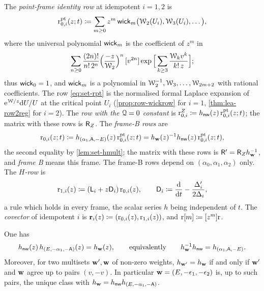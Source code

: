 \begin{defn}
\label{def:set-rows}
The \emph{point-frame identity row} at idempotent $i=1,2$ is
\begin{equation}
\label{eq:set-rpt}
\mathrm{r}^{\mathrm{pt}}_{0,i}(z;t)\coloneqq\sum_{m\geq0}z^m\,\mathsf{wick}_m\big(\mathcal{W}_2(U_i),\mathcal{W}_3(U_i),\ldots\big),
\end{equation}
where the universal polynomial $\mathsf{wick}_m$ is the coefficient of $z^m$ in
\[
\sum_{n\geq0}\frac{(2n)!}{n!\,2^n}\Big(\frac{-z}{\mathcal{W}_2}\Big)^{n}\,[v^{2n}]\exp\Big[\sum_{k\geq3}\frac{\mathcal{W}_kv^k}{k!\,z}\Big];
\]
thus $\mathsf{wick}_0=1$, and $\mathsf{wick}_m$ is a polynomial in $\mathcal{W}_2^{-1},\mathcal{W}_3,\ldots,\mathcal{W}_{2m+2}$ with rational coefficients. The row \eqref{eq:set-rpt} is the normalised formal Laplace expansion of $\mathrm{e}^{\mathcal{W}/z}\mathrm{d} U/U$ at the critical point $U_i$ (\cref{prop:row-wickrow} for $i=1$, \cref{thm:lea-row2reg} for $i=2$). The \emph{row with the $\mathcal{Q}=0$ constant} is $\mathrm{r}^{Z}_{0,i}\coloneqq h_{\mathsf{nw}}(z)\,\mathrm{r}^{\mathrm{pt}}_{0,i}(z;t)$; the matrix with these rows is $\mathsf{R}_{Z}$. The \emph{frame-B rows} are
\begin{equation}
\label{eq:set-rowB}
\mathrm{r}_{0,i}(z;t)\coloneqq h_{(\alpha_1,\mathsf{A},-E)}(z)\,\mathrm{r}^{\mathrm{pt}}_{0,i}(z;t)=h_{\mathbf{w}}(z)^{-1}h_{\mathsf{nw}}(z)\,\mathrm{r}^{\mathrm{pt}}_{0,i}(z;t),
\end{equation}
the second equality by \cref{lem:set-hmult}; the matrix with these rows is $\mathsf{R}'=\mathsf{R}_{Z}h_{\mathbf{w}}^{-1}$, and \emph{frame B} means this frame. The frame-B rows depend on $(\alpha_0,\alpha_1,\alpha_2)$ only. The \emph{$H$-row} is
\begin{equation}
\label{eq:set-Hrow}
\mathrm{r}_{1,i}(z)\coloneqq(\mathsf{L}_i+z\mathsf{D}_i)\,\mathrm{r}_{0,i}(z),\qquad \mathsf{D}_i\coloneqq\frac{\mathrm{d}}{\mathrm{d} t}-\frac{\Delta_i'}{2\Delta_i},
\end{equation}
a rule which holds in every frame, the scalar series $h$ being independent of $t$. The \emph{covector} of idempotent $i$ is $\mathbf{r}_i(z)\coloneqq(\mathrm{r}_{0,i}(z),\mathrm{r}_{1,i}(z))$, and $\mathrm{r}[m]\coloneqq[z^m]\mathrm{r}$.
\end{defn}

\begin{lem}
\label{lem:set-hmult}
One has
\begin{equation}
\label{eq:set-hmult}
h_{\mathsf{nw}}(z)\,h_{(E,-\alpha_1,-\mathsf{A})}(z)=h_{\mathbf{w}}(z),\qquad\text{equivalently}\qquad h_{\mathbf{w}}^{-1}h_{\mathsf{nw}}=h_{(\alpha_1,\mathsf{A},-E)} .
\end{equation}
Moreover, for two multisets $\mathbf{w}',\mathbf{w}$ of non-zero weights, $h_{\mathbf{w}'}=h_{\mathbf{w}}$ if and only if $\mathbf{w}'$ and $\mathbf{w}$ agree up to pairs $(v,-v)$. In particular $\mathbf{w}=(E,-\epsilon_1,-\epsilon_2)$ is, up to such pairs, the unique class with $h_{\mathbf{w}}=h_{\mathsf{nw}} h_{(E,-\alpha_1,-\mathsf{A})}$.
\end{lem}

